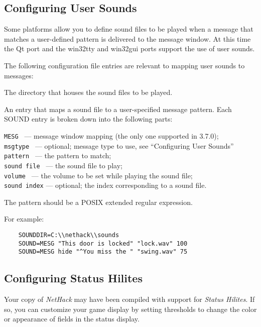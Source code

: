 \subsection*{Configuring User Sounds}

Some platforms allow you to define sound files to be played when a message
that matches a user-defined pattern is delivered to the message window.
At this time the Qt port and the win32tty and win32gui ports support the
use of user sounds.

The following configuration file entries are relevant to mapping user sounds
to messages:

\blist{}
\item[\ib{SOUNDDIR}]
The directory that houses the sound files to be played.
\item[\ib{SOUND}]
An entry that maps a sound file to a user-specified message pattern.
Each SOUND entry is broken down into the following parts:

{\tt MESG       } --- message window mapping (the only one supported in 3.7.0);\\
{\tt msgtype    } --- optional; message type to use, see ``Configuring User Sounds''\\
{\tt pattern    } --- the pattern to match;\\
{\tt sound file } --- the sound file to play;\\
{\tt volume     } --- the volume to be set while playing the sound file;\\
{\tt sound index} --- optional; the index corresponding to a sound file.
\elist

The pattern should be a POSIX extended regular expression.

For example:

\begin{verbatim}
    SOUNDDIR=C:\\nethack\\sounds
    SOUND=MESG "This door is locked" "lock.wav" 100
    SOUND=MESG hide "^You miss the " "swing.wav" 75
\end{verbatim}

\subsection*{Configuring Status Hilites}

Your copy of {\it NetHack\/} may have been compiled with support
for {\it Status Hilites}.
If so, you can customize your game display by setting thresholds to
change the color or appearance of fields in the status display.

